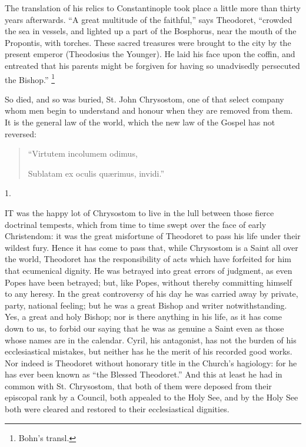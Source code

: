 The translation of his relics to Constantinople took place a little
more than thirty years afterwards. ``A great multitude of the
faithful,'' says Theodoret, ``crowded the sea in vessels, and
lighted up a part of the Bosphorus, near the mouth of the Propontis,
with torches. These sacred treasures were brought to the city by the
present emperor (Theodosius the Younger). He laid his face upon the
coffin, and entreated that his parents might be forgiven for having so
unadvisedly persecuted the Bishop.'' \footnote{Bohn's transl.}

So died, and so was buried, St. John Chrysostom, one of that select
company whom men begin to understand and honour when they are removed
from them. It is the general law of the world, which the new law of
the Gospel has not reversed:

\begin{quote}

``Virtutem incolumem
odimus,

Sublatam ex oculis quærimus, invidi.''

\end{quote}



1.

IT was the happy lot of Chrysostom to
live in the lull between those fierce doctrinal tempests, which from
time to time swept over the face of early Christendom: it was the
great misfortune of Theodoret to pass his life under their wildest
fury. Hence it has come to pass that, while Chrysostom is a Saint all
over the world, Theodoret has the responsibility of acts which have
forfeited for him that ecumenical dignity. He was betrayed into great
errors of judgment, as even Popes have been betrayed; but, like Popes,
without thereby committing himself to any heresy. In the great
controversy of his day he was carried away by private, party, national
feeling; but he was a great Bishop and writer notwithstanding. Yes, a
great and holy Bishop; nor is there anything in his life, as it has
come down to us, to forbid our saying that he was as genuine a Saint
even as those whose names are in the calendar. Cyril, his antagonist,
has not the burden of his ecclesiastical mistakes, but neither has he
the merit of his recorded good works. Nor indeed is Theodoret without
honorary title in the Church's hagiology: for he has ever been known
as ``the Blessed Theodoret.'' And this at least he had
in common with St. Chrysostom, that both of them were deposed from
their episcopal rank by a Council, both appealed to the Holy See, and
by the Holy See both were cleared and restored to their ecclesiastical
dignities.

